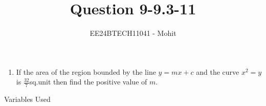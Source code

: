 \documentclass[journal]{IEEEtran}
\numberwithin{equation}{enumi}
\numberwithin{figure}{enumi}
\begin{document}

\title{Question 9-9.3-11}
\author{EE24BTECH11041 - Mohit}
{\let\newpage\relax\maketitle}
\begin{enumerate}
\item 
If the area of the region bounded by the line $y=mx+c$ and the curve $x^2=y$ is $\frac{32}{7}$sq.unit then find the positive value of $m$.
\end{enumerate}
\begin{table}[h!]    
  \centering
  
  \caption{Variables Used}
  \label{tab 1.4.9.2}
\end{table}
	
\end{document}
